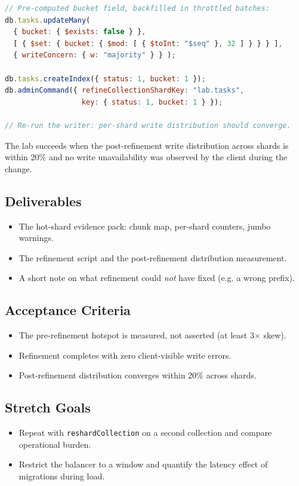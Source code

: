 \begin{lstlisting}[language=JavaScript, caption={Adding a bucket suffix to a live, hot collection.}]
// Pre-computed bucket field, backfilled in throttled batches:
db.tasks.updateMany(
  { bucket: { $exists: false } },
  [ { $set: { bucket: { $mod: [ { $toInt: "$seq" }, 32 ] } } } ],
  { writeConcern: { w: "majority" } } );

db.tasks.createIndex({ status: 1, bucket: 1 });
db.adminCommand({ refineCollectionShardKey: "lab.tasks",
                  key: { status: 1, bucket: 1 } });

// Re-run the writer: per-shard write distribution should converge.
\end{lstlisting}

The lab succeeds when the post-refinement write distribution across shards is within 20\% and no write unavailability was observed by the client during the change.

\subsection*{Deliverables}
\begin{itemize}
    \item The hot-shard evidence pack: chunk map, per-shard counters, jumbo warnings.
    \item The refinement script and the post-refinement distribution measurement.
    \item A short note on what refinement could \emph{not} have fixed (e.g. a wrong prefix).
\end{itemize}

\subsection*{Acceptance Criteria}
\begin{itemize}
    \item The pre-refinement hotspot is measured, not asserted (at least 3$\times$ skew).
    \item Refinement completes with zero client-visible write errors.
    \item Post-refinement distribution converges within 20\% across shards.
\end{itemize}

\subsection*{Stretch Goals}
\begin{itemize}
    \item Repeat with \texttt{reshardCollection} on a second collection and compare operational burden.
    \item Restrict the balancer to a window and quantify the latency effect of migrations during load.
\end{itemize}

